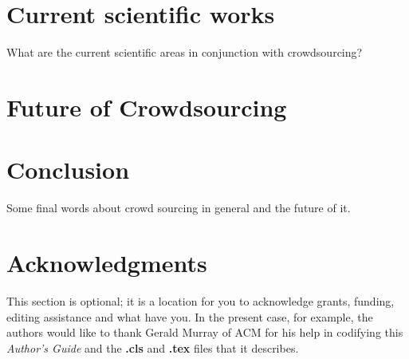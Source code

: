 \documentclass{acm_proc_article-sp}
\begin{document}
\section {Current scientific works}
What are the current scientific areas in conjunction with crowdsourcing? 

\section{Future of Crowdsourcing}

\section{Conclusion}
Some final words about crowd sourcing in general and the future of it.




\section{Acknowledgments}
This section is optional; it is a location for you
to acknowledge grants, funding, editing assistance and
what have you.  In the present case, for example, the
authors would like to thank Gerald Murray of ACM for
his help in codifying this \textit{Author's Guide}
and the \textbf{.cls} and \textbf{.tex} files that it describes.

%

%
%
\end{document}
